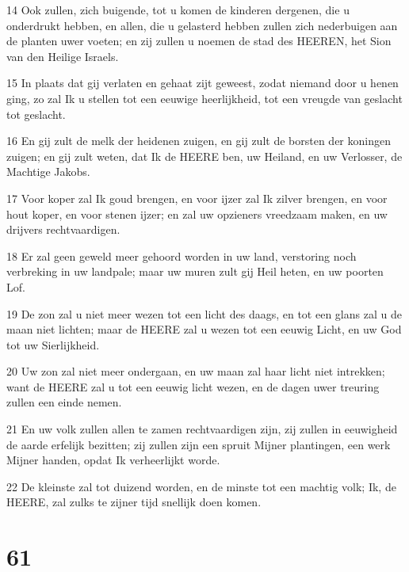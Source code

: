 \par 14 Ook zullen, zich buigende, tot u komen de kinderen dergenen, die u onderdrukt hebben, en allen, die u gelasterd hebben zullen zich nederbuigen aan de planten uwer voeten; en zij zullen u noemen de stad des HEEREN, het Sion van den Heilige Israels.
\par 15 In plaats dat gij verlaten en gehaat zijt geweest, zodat niemand door u henen ging, zo zal Ik u stellen tot een eeuwige heerlijkheid, tot een vreugde van geslacht tot geslacht.
\par 16 En gij zult de melk der heidenen zuigen, en gij zult de borsten der koningen zuigen; en gij zult weten, dat Ik de HEERE ben, uw Heiland, en uw Verlosser, de Machtige Jakobs.
\par 17 Voor koper zal Ik goud brengen, en voor ijzer zal Ik zilver brengen, en voor hout koper, en voor stenen ijzer; en zal uw opzieners vreedzaam maken, en uw drijvers rechtvaardigen.
\par 18 Er zal geen geweld meer gehoord worden in uw land, verstoring noch verbreking in uw landpale; maar uw muren zult gij Heil heten, en uw poorten Lof.
\par 19 De zon zal u niet meer wezen tot een licht des daags, en tot een glans zal u de maan niet lichten; maar de HEERE zal u wezen tot een eeuwig Licht, en uw God tot uw Sierlijkheid.
\par 20 Uw zon zal niet meer ondergaan, en uw maan zal haar licht niet intrekken; want de HEERE zal u tot een eeuwig licht wezen, en de dagen uwer treuring zullen een einde nemen.
\par 21 En uw volk zullen allen te zamen rechtvaardigen zijn, zij zullen in eeuwigheid de aarde erfelijk bezitten; zij zullen zijn een spruit Mijner plantingen, een werk Mijner handen, opdat Ik verheerlijkt worde.
\par 22 De kleinste zal tot duizend worden, en de minste tot een machtig volk; Ik, de HEERE, zal zulks te zijner tijd snellijk doen komen.

\chapter{61}

